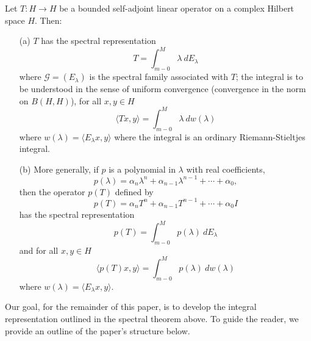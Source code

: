 \begin{theorem}
    Let \( T : H \to H  \) be a bounded self-adjoint linear operator on a complex Hilbert space \( H  \). Then:
    \begin{enumerate}
        \item[(a)] \( T  \) has the spectral representation 
            \[  T = \int_{ m - 0  }^{ M  }  \lambda  \ d {E}_{\lambda} \tag{1} \]
            where \( \mathcal{G} = ({E}_{\lambda}) \) is the spectral family associated with \( T  \); the integral is to be understood in the sense of uniform convergence (convergence in the norm on \(B(H,H) \)), for all \( x,y \in H \) \[  \langle Tx , y \rangle = \int_{ m - 0  }^{  M  } \lambda  \ d w(\lambda) \tag{1*} \]
            where \( w(\lambda) = \langle {E}_{\lambda} x  ,  y  \rangle  \) where the integral is an ordinary Riemann-Stieltjes integral. 
        \item[(b)] More generally, if \( p  \) is a polynomial in \( \lambda  \) with real coefficients,
            \[ p(\lambda) = {\alpha}_{n} \lambda^{n} + {\alpha}_{n-1} \lambda^{n-1} + \cdots  + {\alpha}_{0}, \]
            then the operator \( p(T) \) defined by  
            \[  p(T)  = {\alpha}_{n} T^{n} + {\alpha}_{n-1} T^{n-1} + \cdots + {\alpha}_{0} I \]
            has the spectral representation 
            \[  p(T) = \int_{ m - 0  }^{ M  }  p(\lambda) \ d {E}_{\lambda} \tag{2} \]
            and for all \( x,y \in H  \) 
            \[  \langle p(T) x  , y  \rangle = \int_{ m - 0  }^{  M  }  p(\lambda)  \ d w(\lambda) \tag{2*} \]
            where \( w(\lambda) = \langle {E}_{\lambda}x  , y \rangle \).
    \end{enumerate}
\end{theorem}

Our goal, for the remainder of this paper, is to develop the integral representation outlined in the spectral theorem above. To guide the reader, we provide an outline of the paper's structure below.

